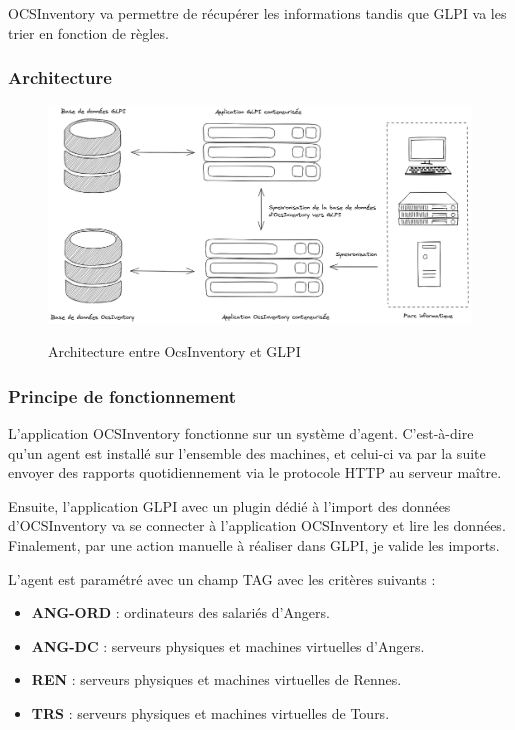 \documentclass[12pt]{article}
\begin{document}
OCSInventory va permettre de récupérer les informations tandis que GLPI va les trier en fonction de règles.

\subsubsection{Architecture}
\begin{figure}[!ht]
    \centering
    \includegraphics[width=\textwidth]{src/Fonctionne GLPI.png}
    \label{fig:glpi}
    \caption{Architecture entre OcsInventory et GLPI}
\end{figure}

\newpage
\subsubsection{Principe de fonctionnement}
L'application OCSInventory fonctionne sur un système d'agent.
C'est-à-dire qu'un agent est installé sur l'ensemble des machines, et celui-ci va par la suite envoyer des rapports quotidiennement via le protocole HTTP au serveur maître. 

Ensuite, l'application GLPI avec un plugin dédié à l'import des données d'OCSInventory va se connecter à l'application OCSInventory et lire les données.
Finalement, par une action manuelle à réaliser dans GLPI, je valide les imports.

L'agent est paramétré avec un champ TAG avec les critères suivants :
\begin{itemize}
    \item \textbf{ANG-ORD} : ordinateurs des salariés d'Angers.
    \item \textbf{ANG-DC} : serveurs physiques et machines virtuelles d'Angers.
    \item \textbf{REN} : serveurs physiques et machines virtuelles de Rennes.
    \item \textbf{TRS} : serveurs physiques et machines virtuelles de Tours.
\end{itemize}
\end{document}
